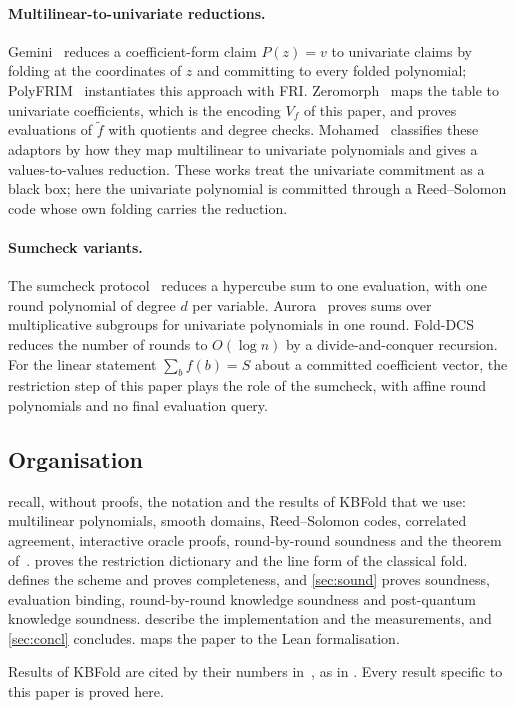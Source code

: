 \paragraph{Multilinear-to-univariate reductions.}
Gemini~\cite{BCHO22} reduces a coefficient-form claim $P(z) = v$ to univariate claims by folding at the coordinates of $z$ and committing to every folded polynomial; PolyFRIM~\cite{ZLGSCLD24} instantiates this approach with FRI.
Zeromorph~\cite{KT24} maps the table to univariate coefficients, which is the encoding $V_f$ of this paper, and proves evaluations of $\tilde f$ with quotients and degree checks.
Mohamed~\cite{Moh25} classifies these adaptors by how they map multilinear to univariate polynomials and gives a values-to-values reduction.
These works treat the univariate commitment as a black box; here the univariate polynomial is committed through a Reed--Solomon code whose own folding carries the reduction.

\paragraph{Sumcheck variants.}
The sumcheck protocol~\cite{LFKN92} reduces a hypercube sum to one evaluation, with one round polynomial of degree $d$ per variable.
Aurora~\cite{BCRSVW19} proves sums over multiplicative subgroups for univariate polynomials in one round.
Fold-DCS~\cite{LMN25} reduces the number of rounds to $O(\log n)$ by a divide-and-conquer recursion.
For the linear statement $\sum_b f(b) = S$ about a committed coefficient vector, the restriction step of this paper plays the role of the sumcheck, with affine round polynomials and no final evaluation query.

\subsection{Organisation}\label{sec:intro:org}

 recall, without proofs, the notation and the results of KBFold that we use: multilinear polynomials, smooth domains, Reed--Solomon codes, correlated agreement, interactive oracle proofs, round-by-round soundness and the theorem of~\cite{CDHZ25}.
 proves the restriction dictionary and the line form of the classical fold.
 defines the scheme and proves completeness, and \cref{sec:sound} proves soundness, evaluation binding, round-by-round knowledge soundness and post-quantum knowledge soundness.
 describe the implementation and the measurements, and \cref{sec:concl} concludes.
 maps the paper to the Lean formalisation.

Results of KBFold are cited by their numbers in~\cite{Mkh26}, as in .
Every result specific to this paper is proved here.
